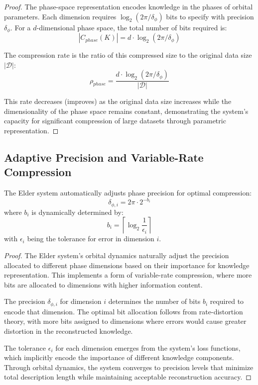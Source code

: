 \begin{proof}
The phase-space representation encodes knowledge in the phases of orbital parameters. Each dimension requires $\log_2(2\pi/\delta_{\phi})$ bits to specify with precision $\delta_{\phi}$. For a $d$-dimensional phase space, the total number of bits required is:
\begin{equation}
|C_{phase}(K)| = d \cdot \log_2(2\pi/\delta_{\phi})
\end{equation}

The compression rate is the ratio of this compressed size to the original data size $|\mathcal{D}|$:
\begin{equation}
\rho_{phase} = \frac{d \cdot \log_2(2\pi/\delta_{\phi})}{|\mathcal{D}|}
\end{equation}

This rate decreases (improves) as the original data size increases while the dimensionality of the phase space remains constant, demonstrating the system's capacity for significant compression of large datasets through parametric representation.
\end{proof}

\subsection{Adaptive Precision and Variable-Rate Compression}

\begin{theorem}
The Elder system automatically adjusts phase precision for optimal compression:
\begin{equation}
\delta_{\phi,i} = 2\pi \cdot 2^{-b_i}
\end{equation}
where $b_i$ is dynamically determined by:
\begin{equation}
b_i = \left\lceil \log_2 \frac{1}{\epsilon_i} \right\rceil
\end{equation}
with $\epsilon_i$ being the tolerance for error in dimension $i$.
\end{theorem}

\begin{proof}
The Elder system's orbital dynamics naturally adjust the precision allocated to different phase dimensions based on their importance for knowledge representation. This implements a form of variable-rate compression, where more bits are allocated to dimensions with higher information content.

The precision $\delta_{\phi,i}$ for dimension $i$ determines the number of bits $b_i$ required to encode that dimension. The optimal bit allocation follows from rate-distortion theory, with more bits assigned to dimensions where errors would cause greater distortion in the reconstructed knowledge.

The tolerance $\epsilon_i$ for each dimension emerges from the system's loss functions, which implicitly encode the importance of different knowledge components. Through orbital dynamics, the system converges to precision levels that minimize total description length while maintaining acceptable reconstruction accuracy.
\end{proof}

